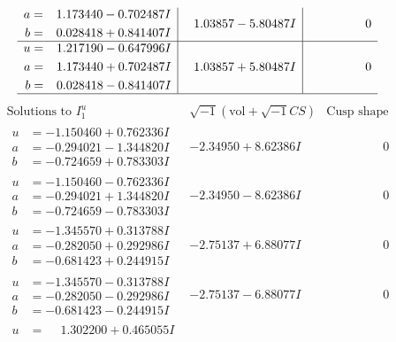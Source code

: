 \documentclass[1p]{elsarticle_modified}
\theoremstyle{definition}
\newcommand{\I}{\sqrt{-1}}
\begin{document}
$$\begin{array}{c|c|c}
\begin{aligned}
a &= \phantom{-}1.173440 - 0.702487 I \\
b &= \phantom{-}0.028418 + 0.841407 I\end{aligned}
 & \phantom{-}1.03857 - 5.80487 I & \phantom{-0.000000 } 0 \\ \hline\begin{aligned}
u &= \phantom{-}1.217190 - 0.647996 I \\
a &= \phantom{-}1.173440 + 0.702487 I \\
b &= \phantom{-}0.028418 - 0.841407 I\end{aligned}
 & \phantom{-}1.03857 + 5.80487 I & \phantom{-0.000000 } 0\\
 \hline 
 \end{array}$$\newpage$$\begin{array}{c|c|c}  
\text{Solutions to }I^u_{1}& \I (\text{vol} + \sqrt{-1}CS) & \text{Cusp shape}\\
 \hline 
\begin{aligned}
u &= -1.150460 + 0.762336 I \\
a &= -0.294021 - 1.344820 I \\
b &= -0.724659 + 0.783303 I\end{aligned}
 & -2.34950 + 8.62386 I & \phantom{-0.000000 } 0 \\ \hline\begin{aligned}
u &= -1.150460 - 0.762336 I \\
a &= -0.294021 + 1.344820 I \\
b &= -0.724659 - 0.783303 I\end{aligned}
 & -2.34950 - 8.62386 I & \phantom{-0.000000 } 0 \\ \hline\begin{aligned}
u &= -1.345570 + 0.313788 I \\
a &= -0.282050 + 0.292986 I \\
b &= -0.681423 + 0.244915 I\end{aligned}
 & -2.75137 + 6.88077 I & \phantom{-0.000000 } 0 \\ \hline\begin{aligned}
u &= -1.345570 - 0.313788 I \\
a &= -0.282050 - 0.292986 I \\
b &= -0.681423 - 0.244915 I\end{aligned}
 & -2.75137 - 6.88077 I & \phantom{-0.000000 } 0 \\ \hline\begin{aligned}
u &= \phantom{-}1.302200 + 0.465055 I \\

\end{aligned}
\end{array}$$
\end{document}
